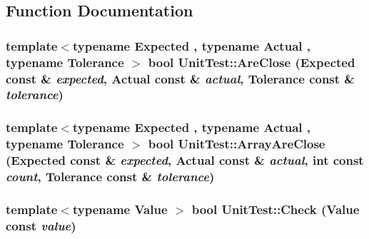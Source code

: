 \subsection{Function Documentation}
\hypertarget{namespace_unit_test_afe3bb3286a28db229c210679f35a90b}{
\subsubsection[{AreClose}]{\setlength{\rightskip}{0pt plus 5cm}template$<$typename Expected , typename Actual , typename Tolerance $>$ bool UnitTest::AreClose (Expected const \& {\em expected}, \/  Actual const \& {\em actual}, \/  Tolerance const \& {\em tolerance})}}
\label{namespace_unit_test_afe3bb3286a28db229c210679f35a90b}


\hypertarget{namespace_unit_test_85e7f57e6cfff23ff830301a81d6f09f}{
\subsubsection[{ArrayAreClose}]{\setlength{\rightskip}{0pt plus 5cm}template$<$typename Expected , typename Actual , typename Tolerance $>$ bool UnitTest::ArrayAreClose (Expected const \& {\em expected}, \/  Actual const \& {\em actual}, \/  int const  {\em count}, \/  Tolerance const \& {\em tolerance})}}
\label{namespace_unit_test_85e7f57e6cfff23ff830301a81d6f09f}


\hypertarget{namespace_unit_test_82fb37498b485a4ba7ec60d2b2505d60}{
\subsubsection[{Check}]{\setlength{\rightskip}{0pt plus 5cm}template$<$typename Value $>$ bool UnitTest::Check (Value const  {\em value})}}
\label{namespace_unit_test_82fb37498b485a4ba7ec60d2b2505d60}


